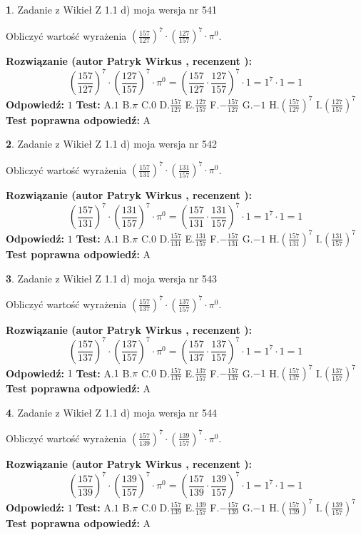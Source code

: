\documentclass[12pt, a4paper]{article}
\theoremstyle{definition} %
\newtheorem{zad}{}
\newcommand{\zadStart}[1]{\begin{zad}#1\newline}
\newcommand{\zadStop}{\end{zad}}
\newcommand{\rozwStart}[2]{\noindent \textbf{Rozwiązanie (autor #1 , recenzent #2): }\newline}
\newcommand{\rozwStop}{\newline}
\newcommand{\odpStart}{\noindent \textbf{Odpowiedź:}\newline}
\newcommand{\odpStop}{\newline}
\newcommand{\testStart}{\noindent \textbf{Test:}\newline}
\newcommand{\testStop}{\newline}
\newcommand{\kluczStart}{\noindent \textbf{Test poprawna odpowiedź:}\newline}
\newcommand{\kluczStop}{\newline}
\begin{document}
\zadStart{Zadanie z Wikieł Z 1.1 d) moja wersja nr 541}

Obliczyć wartość wyrażenia $(\frac{157}{127})^{7} \cdot (\frac{127}{157})^{7} \cdot \pi^{0}$.
\zadStop
\rozwStart{Patryk Wirkus}{}
$$(\frac{157}{127})^{7} \cdot (\frac{127}{157})^{7} \cdot \pi^{0} = (\frac{157}{127} \cdot \frac{127}{157})^{7} \cdot 1 = 1^{7} \cdot 1 = 1$$
\rozwStop
\odpStart
$1$
\odpStop
\testStart
A.$1$ B.$\pi$ C.$0$ D.$\frac{157}{127}$ E.$\frac{127}{157}$
F.$-\frac{157}{127}$ G.$-1$
H.$(\frac{157}{127})^{7}$
I.$(\frac{127}{157})^{7}$
\testStop
\kluczStart
A
\kluczStop



\zadStart{Zadanie z Wikieł Z 1.1 d) moja wersja nr 542}

Obliczyć wartość wyrażenia $(\frac{157}{131})^{7} \cdot (\frac{131}{157})^{7} \cdot \pi^{0}$.
\zadStop
\rozwStart{Patryk Wirkus}{}
$$(\frac{157}{131})^{7} \cdot (\frac{131}{157})^{7} \cdot \pi^{0} = (\frac{157}{131} \cdot \frac{131}{157})^{7} \cdot 1 = 1^{7} \cdot 1 = 1$$
\rozwStop
\odpStart
$1$
\odpStop
\testStart
A.$1$ B.$\pi$ C.$0$ D.$\frac{157}{131}$ E.$\frac{131}{157}$
F.$-\frac{157}{131}$ G.$-1$
H.$(\frac{157}{131})^{7}$
I.$(\frac{131}{157})^{7}$
\testStop
\kluczStart
A
\kluczStop



\zadStart{Zadanie z Wikieł Z 1.1 d) moja wersja nr 543}

Obliczyć wartość wyrażenia $(\frac{157}{137})^{7} \cdot (\frac{137}{157})^{7} \cdot \pi^{0}$.
\zadStop
\rozwStart{Patryk Wirkus}{}
$$(\frac{157}{137})^{7} \cdot (\frac{137}{157})^{7} \cdot \pi^{0} = (\frac{157}{137} \cdot \frac{137}{157})^{7} \cdot 1 = 1^{7} \cdot 1 = 1$$
\rozwStop
\odpStart
$1$
\odpStop
\testStart
A.$1$ B.$\pi$ C.$0$ D.$\frac{157}{137}$ E.$\frac{137}{157}$
F.$-\frac{157}{137}$ G.$-1$
H.$(\frac{157}{137})^{7}$
I.$(\frac{137}{157})^{7}$
\testStop
\kluczStart
A
\kluczStop



\zadStart{Zadanie z Wikieł Z 1.1 d) moja wersja nr 544}

Obliczyć wartość wyrażenia $(\frac{157}{139})^{7} \cdot (\frac{139}{157})^{7} \cdot \pi^{0}$.
\zadStop
\rozwStart{Patryk Wirkus}{}
$$(\frac{157}{139})^{7} \cdot (\frac{139}{157})^{7} \cdot \pi^{0} = (\frac{157}{139} \cdot \frac{139}{157})^{7} \cdot 1 = 1^{7} \cdot 1 = 1$$
\rozwStop
\odpStart
$1$
\odpStop
\testStart
A.$1$ B.$\pi$ C.$0$ D.$\frac{157}{139}$ E.$\frac{139}{157}$
F.$-\frac{157}{139}$ G.$-1$
H.$(\frac{157}{139})^{7}$
I.$(\frac{139}{157})^{7}$
\testStop
\kluczStart
A
\kluczStop
\end{document}
